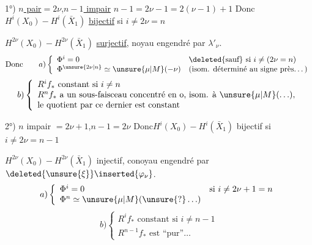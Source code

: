 1°) \uline{$n$ pair}$=2\nu$,\quad \uline{$n-1$ impair}
\qquad $n-1=2\nu-1=2(\nu-1)+1$
\diagram{\[
\left.\begin{array}{ll}
H^*(X_0):&
1,\xi_0,\ldots,\xi_0^{\nu-1},
[\xi_0^\nu,\lambda'_\nu],\frac12\xi_0^{\nu+1},\ldots,\frac12\xi_0^{2\nu-1}\\[5pt]
H^*(\bar X_1):&
1,\xi_1,\ldots,\xi_1^{\nu-1},
\frac12\xi_1^\nu,\frac12\unsure{\xi_1^{\nu+1}},\ldots,\frac12\xi_1^{2\nu-1}
\end{array}\right]
\quad
\begin{array}{l}\xi_0\rightsquigarrow\xi_1\\\lambda'_\nu\rightsquigarrow0\end{array}
\]}
Donc\quad $H^i(X_0)\mathbin{-}H^i(\bar X_1)$
\uline{bijectif}  si $i\ne2\nu=n$

$H^{2\nu}(X_0)\mathbin{-}H^{2\nu}(\bar X_1)$
\uline{surjectif}, noyau engendré par $\lambda'_\nu$.
\[
\text{Donc}\qquad
a)\left\{\begin{array}{ll}
\Phi^i=0&\deleted{\text{sauf}}\ \text{si }i\ne(2\nu=n)\\
\Phi^{\unsure{2\nu|n}}\simeq\unsure{\mu|M}(-\nu)&
\text{(isom. déterminé au signe près\ldots)}
\end{array}\right.
\]
\[
b)\left\{\begin{array}{l}
R^if_*\text{ constant si }i\ne n\\
R^nf_*\text{ a un sous-faisceau concentré en o, isom. à }\unsure{\mu|M}(\ldots),\\
\text{le quotient par ce dernier est constant}
\end{array}\right.
\]

2°) $n$ impair $=2\nu+1$,\qquad $n-1=2\nu$
\diagram{\[
\left.\begin{array}{ll}
H^*(X_0):&
1,\xi_0,\ \xi_0^{\nu-1},\ \xi_0^\nu,\ \frac12\xi_0^{\nu+1},
\ldots,\frac12\xi_0^{2\nu}\\[5pt]
H^*(\bar X_1):&
1,\xi_1,\ldots,\xi_1^{\nu-1},[\xi_1^\nu,\lambda_\nu],
\frac12\xi_1^{\nu+1},\ldots,\frac12\xi_1^{2\nu}
\end{array}\right]
\quad\xi_0\rightsquigarrow\xi_1
\]}
Donc\quad $H^i(X_0)\mathbin{-}H^i(\bar X_1)$ bijectif si $i\ne2\nu=n-1$

$H^{2\nu}(X_0)\mathbin{-}H^{2\nu}(\bar X_1)$ injectif,
conoyau engendré par $\deleted{\unsure{\xi}}\inserted{\varphi_\nu}$.
\[
a)\left\{\begin{array}{ll}
\Phi^i=0&\text{si }i\ne2\nu+1=n\\
\Phi^n\simeq\unsure{\mu|M}(\unsure{?}\ldots)&
\end{array}\right.
\]
\[
b)\left\{\begin{array}{l}
R^if_*\text{ constant si }i\ne n-1\\
R^{n-1}f_*\text{ est ``pur''}\ldots
\end{array}\right.
\]
